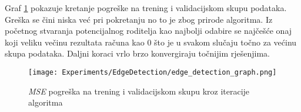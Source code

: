Graf \ref{fig:edge_detection_graph} pokazuje kretanje pogreške na trening i validacijskom skupu podataka.
Greška se čini niska već pri pokretanju no to je zbog prirode algoritma.
Iz početnog stvaranja potencijalnog roditelja kao najbolji odabire se najčešće onaj koji veliku večinu rezultata računa kao $0$ što je u svakom slučaju točno za većinu skupa podataka.
Daljni koraci vrlo brzo konvergiraju točnijim rješenjima.

\begin{figure}
	\centering
	\caption{\emph{MSE} pogreška na trening i validacijskom skupu kroz iteracije algoritma}
	\texttt{[image: Experiments/EdgeDetection/edge\_detection\_graph.png]}
	\label{fig:edge_detection_graph}
\end{figure}
